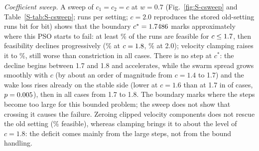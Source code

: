 \begingroup\swResRefs\swResNarrowGraphics{}\endgroup
\emph{Coefficient sweep.} A sweep of $c_1=c_2=c$ at $w=0.7$ (Fig.~\ref{fig:S-csweep} and Table~\ref{S-tab:S-csweep}; \NSRuns{} runs per setting; $c=2.0$ reproduces the stored old-setting runs bit for bit) shows that the boundary $c^\ast=1.7486$ marks approximately where this PSO starts to fail: at least \NSFeasBelow\% of the runs are feasible for $c\le1.7$, then feasibility declines progressively (\NSFeasAbove\% at $c=1.8$, \NSFeasCTwoZero\% at 2.0); velocity clamping raises it to \NSFeasVMax\%, still worse than constriction in all \NSLossCasesVMaxConstr{} cases.
There is no step at $c^\ast$: the decline begins between 1.7 and 1.8 and accelerates, while the swarm spread grows smoothly with $c$ (by about an order of magnitude from $c=1.4$ to 1.7) and the wake loss rises already on the stable side (lower at $c=1.6$ than at 1.7 in \NSLossBetterSixSeven{} of \NSLossCasesSixSeven{} cases, $p=0.005$), then in all \NSLossCasesSevenEight{} cases from 1.7 to 1.8. The boundary marks where the steps become too large for this bounded problem; the sweep does not show that crossing it causes the failure.
Zeroing clipped velocity components does not rescue the old setting (\NSFeasVZero\% feasible), whereas clamping brings it to about the level of $c=1.8$: the deficit comes mainly from the large steps, not from the bound handling.

